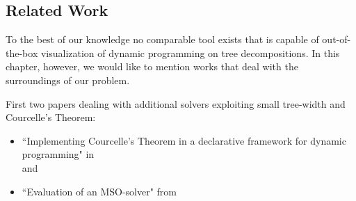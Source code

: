 \documentclass[a4paper, 12pt, bibliography=totoc]{scrartcl}
\begin{document}

\subsection{Related Work}

To the best of our knowledge no comparable tool exists that is capable of out-of-the-box visualization of dynamic programming on tree decompositions.
In this chapter, however, we would like to mention works that deal with the surroundings of our problem.

First two papers dealing with additional solvers exploiting small tree-width and Courcelle's Theorem:
\begin{itemize}
	\item ``Implementing Courcelle's Theorem in a declarative framework for dynamic programming" in \cite{ImplCourcelleDP16} \\
	and
	\item ``Evaluation of an MSO-solver" from \cite{evaluationMSO}
\end{itemize}
%
\end{document}
